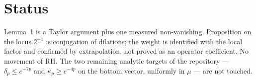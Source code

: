 \documentclass[11pt]{article}
\theoremstyle{remark}\newtheorem*{remark}{Remark}
\begin{document}
\section*{Status}
Lemma~1 is a Taylor argument plus one measured non-vanishing.
Proposition on the locus $2^{\pm1}$ is conjugation of dilations;
the weight is identified with the local factor and confirmed by
extrapolation, not proved as an operator coefficient.
No movement of RH. The two remaining analytic targets of the
repository --- $\delta_p\le e^{-7p}$ and $\kappa_p\ge e^{-4p}$ on
the bottom vector, uniformly in $\mu$ --- are not touched.
\end{document}
